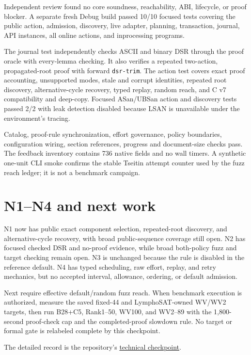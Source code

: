 \documentclass[11pt]{article}
\newcommand{\code}[1]{\texttt{#1}}
\begin{document}
Independent review found no core soundness, reachability, ABI, lifecycle, or
proof blocker. A separate fresh Debug build passed 10/10 focused tests covering
the public action, admission, discovery, live adapter, planning, transaction,
journal, API instances, all online actions, and inprocessing programs.

The journal test independently checks ASCII and binary DSR through the proof
oracle with every-lemma checking. It also verifies a repeated two-action,
propagated-root proof with forward \code{dsr-trim}. The action test covers exact
proof accounting, unsupported modes, stale and corrupt identities, repeated
root discovery, alternative-cycle recovery, typed replay, random reach, and C
v7 compatibility and deep-copy. Focused ASan/UBSan action and discovery tests
passed 2/2 with leak detection disabled because LSAN is unavailable under the
environment's tracing.

Catalog, proof-rule synchronization, effort governance, policy boundaries,
configuration wiring, section references, progress and document-size checks
pass. The feedback inventory contains 736 native fields and no wall timers. A
synthetic one-unit CLI smoke confirms the stable Tseitin attempt counter used by
the fuzz reach ledger; it is not a benchmark campaign.

\section*{N1--N4 and next work}

N1 now has public exact component selection, repeated-root discovery, and
alternative-cycle recovery, with broad public-sequence coverage still open. N2
has focused checked DSR and no-proof evidence, while broad both-policy fuzz and
target checking remain open. N3 is unchanged because the rule is disabled in
the reference default. N4 has typed scheduling, raw effort, replay, and retry
mechanics, but no accepted interval, allowance, ordering, or default admission.

Next require effective default/random fuzz reach. When benchmark execution is
authorized, measure the saved fixed-44 and LymphoSAT-owned WV/WV2 targets, then
run B28+C5, Rank1--50, WV100, and WV2--89 with the 1,800-second proof-check cap
and the completed-proof slowdown rule. No target or formal gate is relabeled
complete by this checkpoint.

The detailed record is the repository's
\href{../../benchmarks/reports/2026-10-04-public-tseitin-cycle-breaking-action.md}{technical checkpoint}.
\end{document}
